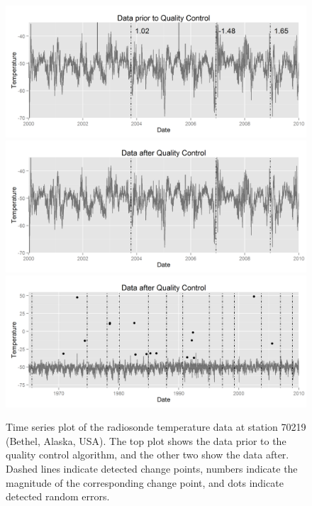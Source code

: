 \documentclass[12pt]{article}
\begin{document}
\begin{figure}
	\centering
	\includegraphics[width=.9\textwidth]{"70219_Data_Unhomogenized_zoomed"}
	\includegraphics[width=.9\textwidth]{"70219_Data_Homogenized_zoomed"}
	\includegraphics[width=.9\textwidth]{"70219_Data_Homogenized"}	
	\caption{Time series plot of the radiosonde temperature data at station 70219 (Bethel, Alaska, USA).  The top plot shows the data prior to the quality control algorithm, and the other two show the data after.  Dashed lines indicate detected change points, numbers indicate the magnitude of the corresponding change point, and dots indicate detected random errors.}
	\label{fig:caseStudy}
\end{figure}

\end{document}
